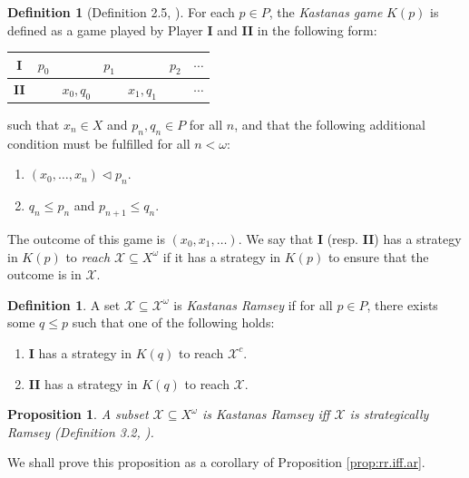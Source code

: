 \documentclass[11pt,reqno]{amsart}
\theoremstyle{plain}
\numberwithin{equation}{section}
\newtheorem{proposition}[theorem]{Proposition}
\theoremstyle{definition}
\newtheorem{definition}[theorem]{Definition}
\newcommand{\cal}{\mathcal}
\newcommand{\X}{\cal{X}}
\begin{document}
\begin{definition}[Definition 2.5, \cite{d20}]
    For each $p \in P$, the \emph{Kastanas game} $K(p)$ is defined as a game played by Player \textbf{I} and \textbf{II} in the following form:
    \begin{center}
        \begin{tabular}{c|cccccc}
            \textbf{I} & $p_0$ & & $p_1$ & & $p_2$ & $\cdots$ \\
            \hline
            \textbf{II} & & $x_0,q_0$ & & $x_1,q_1$ & & $\cdots$ 
        \end{tabular}
    \end{center}
    such that $x_n \in X$ and $p_n,q_n \in P$ for all $n$, and that the following additional condition must be fulfilled for all $n < \omega$:
    \begin{enumerate}
        \item $(x_0,\dots,x_n) \lhd p_n$.

        \item $q_n \leq p_n$ and $p_{n+1} \leq q_n$.
    \end{enumerate}
    The outcome of this game is $(x_0,x_1,\dots)$. We say that \textbf{I} (resp. \textbf{II}) has a strategy in $K(p)$ to \emph{reach} $\X \subseteq X^\omega$ if it has a strategy in $K(p)$ to ensure that the outcome is in $\X$. 
\end{definition}

\begin{definition}
\label{def:kr.gowers}
    A set $\X \subseteq \X^\omega$ is \emph{Kastanas Ramsey} if for all $p \in P$, there exists some $q \leq p$ such that one of the following holds:
    \begin{enumerate}
        \item \textbf{I} has a strategy in $K(q)$ to reach $\X^c$.

        \item \textbf{II} has a strategy in $K(q)$ to reach $\X$.
    \end{enumerate}
\end{definition}


\begin{proposition}
\label{prop:kr.iff.sr}
    A subset $\X \subseteq X^\omega$ is Kastanas Ramsey iff $\X$ is strategically Ramsey (Definition 3.2, \cite{d20}).
\end{proposition}


We shall prove this proposition as a corollary of Proposition \ref{prop:rr.iff.ar}. 
\end{document}

